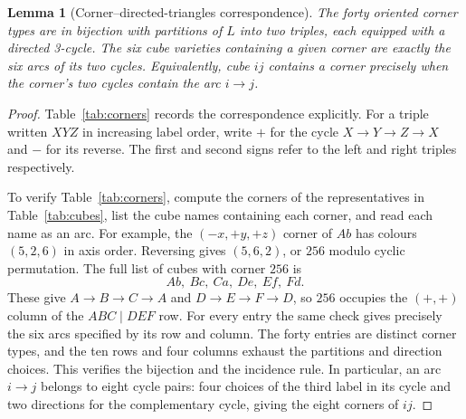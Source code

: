 \documentclass[11pt]{article}
\newtheorem{lemma}[theorem]{Lemma}
\begin{document}
\begin{lemma}[Corner--directed-triangles correspondence]
\label{lem:corner-triangles}
The forty oriented corner types are in bijection with partitions of $L$
into two triples, each equipped with a directed 3-cycle. The six cube
varieties containing a given corner are exactly the six arcs of its two
cycles. Equivalently, cube $ij$ contains a corner precisely when the corner's
two cycles contain the arc $i\to j$.
\end{lemma}
\begin{proof}
Table~\ref{tab:corners} records the correspondence explicitly. For a triple
written $XYZ$ in increasing label order, write $+$ for the cycle
$X\to Y\to Z\to X$ and $-$ for its reverse. The first and second signs
refer to the left and right triples respectively.

To verify Table~\ref{tab:corners}, compute the corners of the representatives
in Table~\ref{tab:cubes}, list the cube names containing each corner, and
read each name as an arc. For example, the $(-x,+y,+z)$ corner of $Ab$
has colours $(5,2,6)$ in axis order. Reversing gives $(5,6,2)$, or $256$
modulo cyclic permutation. The full list of cubes with corner $256$ is
\[
 Ab,\ Bc,\ Ca,\ De,\ Ef,\ Fd.
\]
These give $A\to B\to C\to A$ and $D\to E\to F\to D$, so $256$
occupies the $(+,+)$ column of the $ABC\mid DEF$ row. For every entry the
same check gives precisely the six arcs specified by its row and column.
The forty entries are distinct corner types, and the ten rows and four
columns exhaust the partitions and direction choices. This verifies the
bijection and the incidence rule. In particular, an arc $i\to j$ belongs
to eight cycle pairs: four choices of the third label in its cycle and two
directions for the complementary cycle, giving the eight corners of $ij$.
\end{proof}
\end{document}
